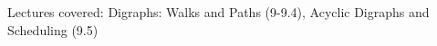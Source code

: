 \documentclass[handout]{mcs}
\begin{document}
\renewcommand{\reading}{Section~\bref{psec:diwalks}.\ \emph{Walks and Paths
	} through~\bref{dag_sec}.\ \emph{Directed Acyclic Graphs}.
}


\begin{staffnotes}
Lectures covered: Digraphs: Walks and Paths (9-9.4), Acyclic Digraphs and Scheduling (9.5)
\end{staffnotes}






\end{document}
